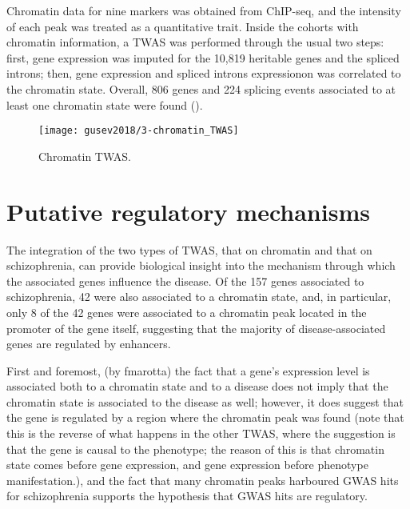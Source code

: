 \documentclass[../main.tex]{subfiles}
\begin{document}
Chromatin data for nine markers was obtained from 
ChIP-seq, and the intensity of each peak was treated as a quantitative trait. 
Inside the cohorts with chromatin information, a TWAS was performed 
through the usual two steps: first, gene expression was imputed for the 
10,819 heritable genes and the spliced introns; then, gene expression 
and spliced introns expressionon was correlated to the chromatin state. 
Overall, 806 genes and 224 splicing events associated to at least one 
chromatin state were found ().

\begin{figure}
	\texttt{[image: gusev2018/3-chromatin\_TWAS]}
	\caption{Chromatin TWAS.}
\end{figure}

\section{Putative regulatory mechanisms}

The integration of the two types of TWAS, that on chromatin and that on 
schizophrenia, can provide biological insight into the mechanism through 
which the associated genes influence the disease. Of the 157 genes 
associated to schizophrenia, 42 were also associated to a chromatin 
state, and, in particular, only 8 of the 42 genes were associated to a 
chromatin peak located in the promoter of the gene itself, suggesting 
that the majority of disease-associated genes are regulated by 
enhancers.

First and foremost, (by fmarotta) the fact that a gene's expression 
level is associated both to a chromatin state and to a disease does not 
imply that the chromatin state is associated to the disease as well; 
however, it does suggest that the gene is regulated by a region where 
the chromatin peak was found (note that this is the reverse of what 
happens in the other TWAS, where the suggestion is that the gene is 
causal to the phenotype; the reason of this is that chromatin state 
comes before gene expression, and gene expression before phenotype 
manifestation.), and the fact that many chromatin peaks harboured GWAS 
hits for schizophrenia supports the hypothesis that GWAS hits are 
regulatory.
\end{document}
